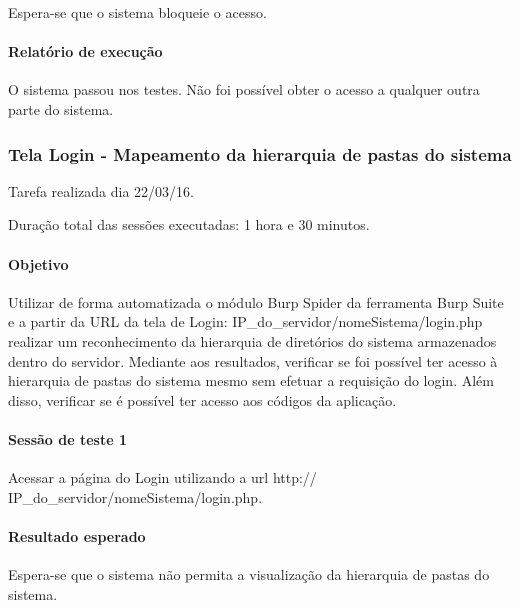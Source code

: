 \documentclass[
    12pt,               %
    openright,          %
    oneside,            %
    a4paper,            %
    section=TITLE,     %
    english,            %
    french,             %
    spanish,            %
    brazil              %
    ]{abntex2}
\begin{document}
Espera-se que o sistema bloqueie o acesso.



\paragraph*{Relatório de execução}

O sistema passou nos testes. Não foi possível obter o acesso a qualquer outra parte do sistema.





\subsubsection*{Tela Login - Mapeamento da hierarquia de pastas do sistema}

Tarefa realizada dia 22/03/16.


Duração total das sessões executadas: 1 hora e 30 minutos.



\paragraph*{Objetivo}

Utilizar de forma automatizada o módulo Burp Spider da ferramenta Burp Suite e a partir da URL da tela de Login: IP\_do\_servidor/nomeSistema/login.php realizar um reconhecimento da hierarquia de diretórios do sistema armazenados dentro do servidor. Mediante aos resultados, verificar se foi possível ter acesso à hierarquia de pastas do sistema mesmo sem efetuar a requisição do login. Além disso, verificar se é possível ter acesso aos códigos da aplicação.





\paragraph*{Sessão de teste 1}

Acessar a página do Login utilizando a url http:// IP\_do\_servidor/nomeSistema/login.php.



\paragraph*{Resultado esperado}

Espera-se que o sistema não permita a visualização da hierarquia de pastas do sistema.
\end{document}
